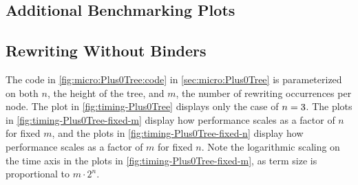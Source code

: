 \begin{subappendices}


\section{Additional Benchmarking Plots}\label{sec:additionalPlots}

\subsection{Rewriting Without Binders}\label{sec:additionalPlots:Plus0Tree}

The code in \autoref{fig:micro:Plus0Tree:code} in \autoref{sec:micro:Plus0Tree} is parameterized on both $n$, the height of the tree, and $m$, the number of rewriting occurrences per node.
The plot in \autoref{fig:timing-Plus0Tree} displays only the case of $n=3$.
The plots in \autoref{fig:timing-Plus0Tree-fixed-m} display how performance scales as a factor of $n$ for fixed $m$, and the plots in \autoref{fig:timing-Plus0Tree-fixed-n} display how performance scales as a factor of $m$ for fixed $n$.
Note the logarithmic scaling on the time axis in the plots in \autoref{fig:timing-Plus0Tree-fixed-m}, as term size is proportional to $m\cdot 2^n$.


\end{subappendices}
